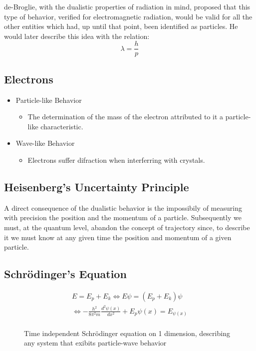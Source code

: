 \documentclass[10pt]{article}
\begin{document}
de-Broglie, with the dualistic properties of radiation in mind,
proposed that this type of behavior, verified for electromagnetic radiation,
would be valid for all the other entities which had, up until that point, been
identified as particles. He would later describe this idea with the
relation:
$$\lambda = \frac{h}{p}$$

\subsection{Electrons}
\begin{itemize}
	\item Particle-like Behavior
	      \begin{itemize}
	      	\item The determination of the mass of the electron attributed to
	      	      it a particle-like characteristic.
	      \end{itemize}
	\item Wave-like Behavior
	      \begin{itemize}
	      	\item Electrons suffer difraction when interferring with crystals.
	      \end{itemize}
\end{itemize}

\subsection{Heisenberg's Uncertainty Principle}
A direct consequence of the dualistic behavior is the impossibily of measuring
with precision the position and the momentum of a particle. Subsequently we
must, at the quantum level, abandon the concept of trajectory since, to describe
it we must know at any given time the position and momentum of a given particle.

\subsection{Schrödinger's Equation}
\begin{figure}[H]
	\centering
	\begin{align*}
		E = E_p + E_k \iff E\psi = (E_p + E_k)\psi                                   \\
		\iff -\frac{h^2}{8\pi^2 m}\frac{d^2\psi(x)}{dx^2} + E_p\psi(x) = E_{\psi(x)} \\
	\end{align*}
	\caption*{Time independent Schrödinger equation on 1 dimension, describing any system that exibits particle-wave behavior}
\end{figure}
\end{document}
